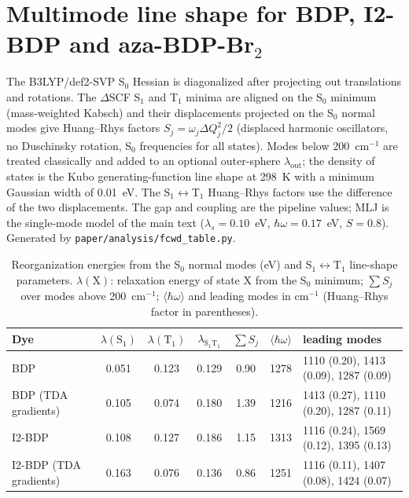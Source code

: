 \section{Multimode line shape for BDP, I2-BDP and aza-BDP-Br$_2$}
\label{sec:si-fcwd}

The B3LYP/def2-SVP S$_0$ Hessian is diagonalized after projecting out translations and rotations. The $\Delta$SCF S$_1$ and T$_1$ minima are aligned on the S$_0$ minimum (mass-weighted Kabsch) and their displacements projected on the S$_0$ normal modes give Huang--Rhys factors $S_j=\omega_j\Delta Q_j^2/2$ (displaced harmonic oscillators, no Duschinsky rotation, S$_0$ frequencies for all states). Modes below 200~cm$^{-1}$ are treated classically and added to an optional outer-sphere $\lambda_\mathrm{out}$; the density of states is the Kubo generating-function line shape at 298~K with a minimum Gaussian width of 0.01~eV. The S$_1\leftrightarrow$T$_1$ Huang--Rhys factors use the difference of the two displacements. The gap and coupling are the pipeline values; MLJ is the single-mode model of the main text ($\lambda_s=0.10$~eV, $\hbar\omega=0.17$~eV, $S=0.8$). Generated by \texttt{paper/analysis/fcwd\_table.py}.

\begin{table}[h]\centering\small
\caption{Reorganization energies from the S$_0$ normal modes (eV) and S$_1\leftrightarrow$T$_1$ line-shape parameters. $\lambda(\mathrm{X})$: relaxation energy of state X from the S$_0$ minimum; $\sum S_j$ over modes above 200~cm$^{-1}$; $\langle\hbar\omega\rangle$ and leading modes in cm$^{-1}$ (Huang--Rhys factor in parentheses).}
\begin{tabular}{p{2.6cm}cccccp{4.2cm}}\hline
Dye & $\lambda(\mathrm{S}_1)$ & $\lambda(\mathrm{T}_1)$ & $\lambda_{\mathrm{S}_1\mathrm{T}_1}$ & $\sum S_j$ & $\langle\hbar\omega\rangle$ & leading modes \\ \hline
BDP & 0.051 & 0.123 & 0.129 & 0.90 & 1278 & 1110 (0.20), 1413 (0.09), 1287 (0.09) \\
BDP (TDA gradients) & 0.105 & 0.074 & 0.180 & 1.39 & 1216 & 1413 (0.27), 1110 (0.20), 1287 (0.11) \\
I2-BDP & 0.108 & 0.127 & 0.186 & 1.15 & 1313 & 1116 (0.24), 1569 (0.12), 1395 (0.13) \\
I2-BDP (TDA gradients) & 0.163 & 0.076 & 0.136 & 0.86 & 1251 & 1116 (0.11), 1407 (0.08), 1424 (0.07) \\
\hline\end{tabular}\end{table}

